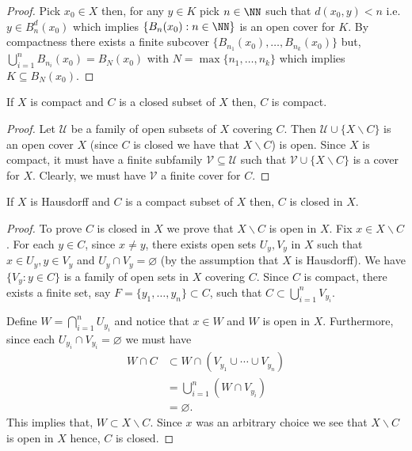 \documentclass[12pt, a4paper]{article}
\begin{document}
\begin{proof}
    Pick \(x_0 \in X\) then, for any \(y \in K\) pick \(n \in \NN\) such that \(d(x_0,y)<n\) i.e. \(y \in B_n^d(x_0)\) which implies \(\{B_n(x_0):n \in \NN\}\) is an open cover for \(K\). By compactness there exists a finite subcover \(\{B_{n_1}(x_0),\ldots, B_{n_k}(x_0)\}\) but, \(\bigcup_{i=1}^n B_{n_i}(x_0)=B_N(x_0)\) with \(N =\max\{n_1,\ldots,n_k\}\) which implies \(K \subseteq B_N(x_0)\).
\end{proof}

\begin{mdprop}
    If \(X\) is compact and \(C\) is a closed subset of \(X\) then, \(C\) is compact.
\end{mdprop}

\begin{proof}
    Let \(\mathcal{U}\) be a family of open subsets of \(X\) covering \(C\). Then \(\mathcal{U} \cup \{X \backslash C\}\) is an open cover \(X\) (since \(C\) is closed we have that \(X \backslash C\)) is open. Since \(X\)  is compact, it must have a finite subfamily \(\mathcal{V} \subseteq \mathcal{U}\) such that \(\mathcal{V} \cup \{X \backslash C\}\) is a cover for \(X\). Clearly, we must have \(\mathcal{V}\) a finite cover for \(C\).
\end{proof}

\begin{mdthm}
    If \(X\) is Hausdorff and \(C\) is a compact subset of \(X\) then, \(C\) is closed in \(X\).
\end{mdthm}

\begin{proof}
    To prove \(C\) is closed in \(X\) we prove that \(X\backslash C\) is open in \(X\). Fix \(x \in X \backslash C\). For each \(y \in C\), since \(x\neq y\), there exists open sets \(U_y,V_y\) in \(X\) such that \(x \in U_y, y\in V_y\) and \(U_y \cap V_y =\varnothing\) (by the assumption that \(X\) is Hausdorff). We have \(\{V_y : y\in C\}\) is a family of open sets in \(X\) covering \(C\). Since \(C\) is compact, there exists a finite set, say \(F = \{y_1,\ldots,y_n\} \subset C\), such that \(C \subset \bigcup_{i=1}^{n} V_{y_i}\). 

    Define \(W = \bigcap_{i=1}^n U_{y_i}\) and notice that \(x \in W\) and \(W\) is open in \(X\). Furthermore, since each \(U_{y_i} \cap V_{y_i} = \varnothing\) we must have 
    \[\begin{aligned}
        W \cap C &\subset W \cap (V_{y_1} \cup \cdots \cup V_{y_n}) \\
        &= \bigcup_{i=1}^n (W \cap V_{y_i}) \\
        &= \varnothing.
    \end{aligned}\]
    This implies that, \(W \subset X \backslash C\). Since \(x\) was an arbitrary choice we see that \(X \backslash C\) is open in \(X\) hence, \(C\) is closed.
\end{proof}
\end{document}
